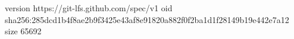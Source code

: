 version https://git-lfs.github.com/spec/v1
oid sha256:285dcd1b4f8ae2b9f3425e43af8e91820a882f0f2ba1d1f28149b19e442e7a12
size 65692

